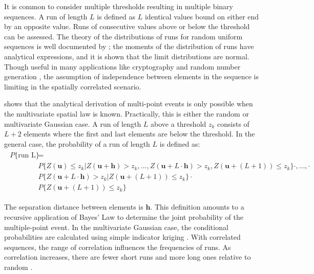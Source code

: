 It is common to consider multiple thresholds resulting in multiple binary sequences. A run of length $L$ is defined as $L$ identical values bound on either end by an opposite value. Runs of consecutive values above or below the threshold can be assessed. The theory of the distributions of runs for random uniform sequences is well documented by \cite{mood1940distribution}; the moments of the distribution of runs have analytical expressions, and it is shown that the limit distributions are normal. Though useful in many applications like cryptography and random number generation \citep{rukhin2010statistical}, the assumption of independence between elements in the sequence is limiting in the spatially correlated scenario.

\cite{ortiz2003characterization} shows that the analytical derivation of multi-point events is only possible when the multivariate spatial law is known. Practically, this is either the random or multivariate Gaussian case. A run of length $L$ above a threshold $z_{k}$ consists of $L+2$ elements where the first and last elements are below the threshold. In the general case, the probability of a run of length $L$ is defined as:
\begin{align}
    \begin{split}
        P\{\text{run L}\} & =                                                                                                                                                                \\
                          & P\{Z(\mathbf{u}) \leq z_{k}| Z(\mathbf{u + h}) > z_{k},\dots, Z(\mathbf{u} + L \cdot \mathbf{h}) > z_{k}, Z(\mathbf{u} + (L+1)) \leq z_{k}\} \cdot ,\dots, \cdot \\
                          & P\{Z(\mathbf{u} + L \cdot \mathbf{h}) > z_{k} | Z(\mathbf{u} + (L+1)) \leq z_{k}\} \cdot                                                                         \\
                          & P\{Z(\mathbf{u} + (L+1)) \leq z_{k}\}
    \end{split}
\end{align}

The separation distance between elements is $\mathbf{h}$. This definition amounts to a recursive application of Bayes' Law to determine the joint probability of the multiple-point event. In the multivariate Gaussian case, the conditional probabilities are calculated using simple indicator kriging \citep{journel1989nongaussian}. With correlated sequences, the range of correlation influences the frequencies of runs. As correlation increases, there are fewer short runs and more long ones relative to random \citep{ortiz2003characterization}.

